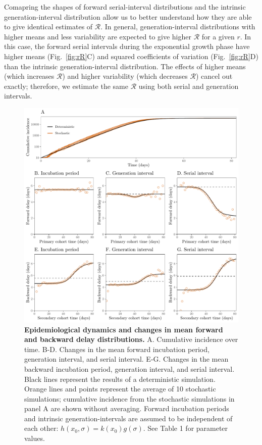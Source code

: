 \documentclass[12pt]{article}
\newcommand{\fref}[1]{Fig.~\ref{fig:#1}}
\begin{document}
Comapring the shapes of forward serial-interval distributions and the intrinsic generation-interval distribution allow us to better understand how they are able to give identical estimates of $\mathcal R$.
In general, generation-interval distributions with higher means and less variability are expected to give higher $\mathcal R$ for a given $r$.
In this case, the forward serial intervals during the exponential growth phase have higher means (\fref{rR}C) and squared coefficients of variation (\fref{rR}D) than the intrinsic generation-interval distribution.
The effects of higher means (which increases $\mathcal R$) and higher variability (which decreases $\mathcal R$) cancel out exactly;
therefore, we estimate the same $\mathcal R$ using both serial and generation intervals.

\begin{figure}[!th]
\includegraphics[width=\textwidth]{forward.pdf}
\caption{
\textbf{Epidemiological dynamics and changes in mean forward and backward delay distributions.}
A. Cumulative incidence over time.
B-D. Changes in the mean forward incubation period, generation interval, and serial interval.
E-G. Changes in the mean backward incubation period, generation interval, and serial interval.
Black lines represent the results of a deterministic simulation.
Orange lines and points represent the average of 10 stochastic simulations;
cumulative incidence from the stochastic simulations in panel A are shown without averaging.
Forward incubation periods and intrinsic generation-intervals are assumed to be independent of each other: $h(x_0, \sigma) = k(x_0) g(\sigma)$.
See Table 1 for parameter values.
}
\label{fig:epi}
\end{figure}
\end{document}
